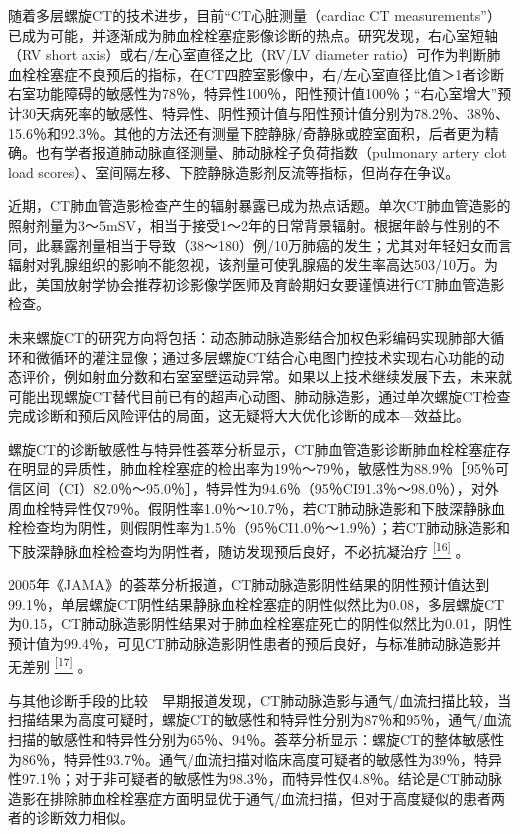 随着多层螺旋CT的技术进步，目前“CT心脏测量（cardiac CT
measurements”）已成为可能，并逐渐成为肺血栓栓塞症影像诊断的热点。研究发现，右心室短轴（RV
short axis）或右/左心室直径之比（RV/LV diameter
ratio）可作为判断肺血栓栓塞症不良预后的指标，在CT四腔室影像中，右/左心室直径比值＞1者诊断右室功能障碍的敏感性为78％，特异性100％，阳性预计值100％；“右心室增大”预计30天病死率的敏感性、特异性、阴性预计值与阳性预计值分别为78.2％、38％、15.6％和92.3％。其他的方法还有测量下腔静脉/奇静脉或腔室面积，后者更为精确。也有学者报道肺动脉直径测量、肺动脉栓子负荷指数（pulmonary
artery clot load
scores）、室间隔左移、下腔静脉造影剂反流等指标，但尚存在争议。

近期，CT肺血管造影检查产生的辐射暴露已成为热点话题。单次CT肺血管造影的照射剂量为3～5mSV，相当于接受1～2年的日常背景辐射。根据年龄与性别的不同，此暴露剂量相当于导致（38～180）例/10万肺癌的发生；尤其对年轻妇女而言辐射对乳腺组织的影响不能忽视，该剂量可使乳腺癌的发生率高达503/10万。为此，美国放射学协会推荐初诊影像学医师及育龄期妇女要谨慎进行CT肺血管造影检查。

未来螺旋CT的研究方向将包括：动态肺动脉造影结合加权色彩编码实现肺部大循环和微循环的灌注显像；通过多层螺旋CT结合心电图门控技术实现右心功能的动态评价，例如射血分数和右室室壁运动异常。如果以上技术继续发展下去，未来就可能出现螺旋CT替代目前已有的超声心动图、肺动脉造影，通过单次螺旋CT检查完成诊断和预后风险评估的局面，这无疑将大大优化诊断的成本---效益比。

螺旋CT的诊断敏感性与特异性荟萃分析显示，CT肺血管造影诊断肺血栓栓塞症存在明显的异质性，肺血栓栓塞症的检出率为19％～79％，敏感性为88.9％［95％可信区间（CI）82.0％～95.0％］，特异性为94.6％（95％CI91.3％～98.0％），对外周血栓特异性仅79％。假阴性率1.0％～10.7％，若CT肺动脉造影和下肢深静脉血栓检查均为阴性，则假阴性率为1.5％（95％CI1.0％～1.9％）；若CT肺动脉造影和下肢深静脉血栓检查均为阴性者，随访发现预后良好，不必抗凝治疗
\protect\hyperlink{text00022.htmlux5cux23ch16-21}{\textsuperscript{{[}16{]}}}
。

2005年《JAMA》的荟萃分析报道，CT肺动脉造影阴性结果的阴性预计值达到99.1％，单层螺旋CT阴性结果静脉血栓栓塞症的阴性似然比为0.08，多层螺旋CT为0.15，CT肺动脉造影阴性结果对于肺血栓栓塞症死亡的阴性似然比为0.01，阴性预计值为99.4％，可见CT肺动脉造影阴性患者的预后良好，与标准肺动脉造影并无差别
\protect\hyperlink{text00022.htmlux5cux23ch17-21}{\textsuperscript{{[}17{]}}}
。

与其他诊断手段的比较　早期报道发现，CT肺动脉造影与通气/血流扫描比较，当扫描结果为高度可疑时，螺旋CT的敏感性和特异性分别为87％和95％，通气/血流扫描的敏感性和特异性分别为65％、94％。荟萃分析显示：螺旋CT的整体敏感性为86％，特异性93.7％。通气/血流扫描对临床高度可疑者的敏感性为39％，特异性97.1％；对于非可疑者的敏感性为98.3％，而特异性仅4.8％。结论是CT肺动脉造影在排除肺血栓栓塞症方面明显优于通气/血流扫描，但对于高度疑似的患者两者的诊断效力相似。

